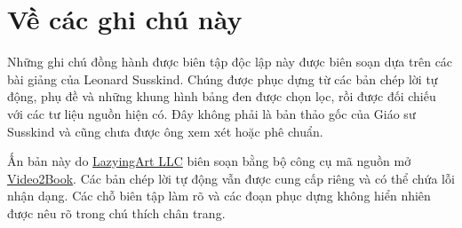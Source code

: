 \documentclass[11pt,oneside]{book}
\begin{document}
\frontmatter
\hypersetup{pageanchor=false}

\hypersetup{pageanchor=true}

\clearpage
\chapter*{Về các ghi chú này}
Những ghi chú đồng hành được biên tập độc lập này được biên soạn dựa trên các bài giảng của Leonard Susskind. Chúng được phục dựng từ các bản chép lời tự động, phụ đề và những khung hình bảng đen được chọn lọc, rồi được đối chiếu với các tư liệu nguồn hiện có. Đây không phải là bản thảo gốc của Giáo sư Susskind và cũng chưa được ông xem xét hoặc phê chuẩn.

Ấn bản này do \href{https://lazying.art}{LazyingArt LLC} biên soạn bằng bộ công cụ mã nguồn mở \href{https://github.com/lachlanchen/Video2Book}{Video2Book}. Các bản chép lời tự động vẫn được cung cấp riêng và có thể chứa lỗi nhận dạng. Các chỗ biên tập làm rõ và các đoạn phục dựng không hiển nhiên được nêu rõ trong chú thích chân trang.
\clearpage
\tableofcontents
\mainmatter









\end{document}
